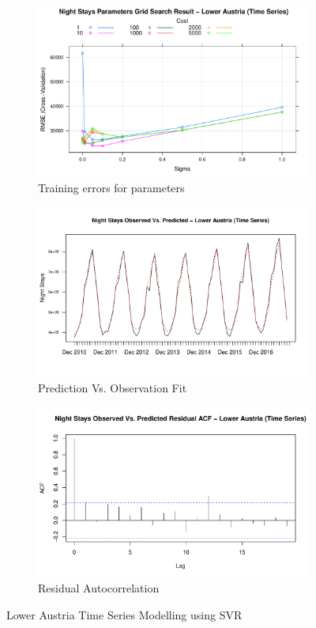 \documentclass[a4paper,reqno,]{article}
\begin{document}
\begin{figure}[H]
  \centering
  \begin{subfigure}[b]{0.32\linewidth}
    \includegraphics[width=\linewidth]{images/SVR/LowerAustriaGrid.pdf}
    \caption{Training errors for parameters}
  \end{subfigure}
  \begin{subfigure}[b]{0.32\linewidth}
    \includegraphics[width=\linewidth]{images/SVR/LowerAustriaTimeSeries.pdf}
    \caption{Prediction Vs. Observation Fit}
  \end{subfigure}
  \begin{subfigure}[b]{0.32\linewidth}
    \includegraphics[width=\linewidth]{images/SVR/LowerAustriaACF.pdf}
    \caption{Residual Autocorrelation}
  \end{subfigure}
  \caption{Lower Austria Time Series Modelling using SVR}
  \label{fig:Time Series}
\end{figure}
\end{document}
